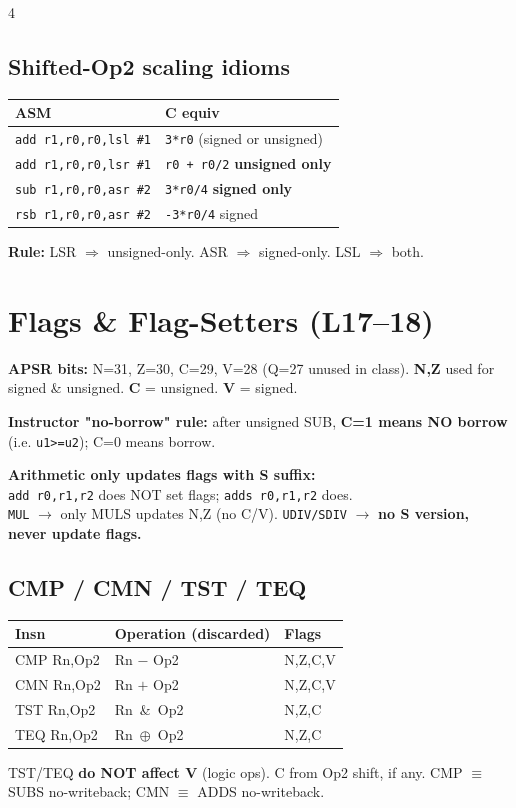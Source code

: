 \documentclass[8pt,landscape]{extarticle}
\newcommand{\asm}[1]{\texttt{\scriptsize #1}}
\newcommand{\cee}[1]{\texttt{\scriptsize #1}}
\begin{document}
\begin{multicols*}{4}
\subsection{Shifted-Op2 scaling idioms}
\begin{tabular}{@{}ll@{}}
\toprule
ASM & C equiv \\
\midrule
\asm{add r1,r0,r0,lsl \#1} & \cee{3*r0} (signed or unsigned) \\
\asm{add r1,r0,r0,lsr \#1} & \cee{r0 + r0/2} \textbf{unsigned only} \\
\asm{sub r1,r0,r0,asr \#2} & \cee{3*r0/4} \textbf{signed only} \\
\asm{rsb r1,r0,r0,asr \#2} & \cee{-3*r0/4} signed \\
\bottomrule
\end{tabular}

\textbf{Rule:} LSR $\Rightarrow$ unsigned-only. ASR $\Rightarrow$ signed-only. LSL $\Rightarrow$ both.

\section{Flags \& Flag-Setters (L17--18)}

\textbf{APSR bits:} N=31, Z=30, C=29, V=28 (Q=27 unused in class).
\textbf{N,Z} used for signed \& unsigned. \textbf{C} = unsigned. \textbf{V} = signed.

\textbf{Instructor "no-borrow" rule:} after unsigned SUB, \textbf{C=1 means NO borrow} (i.e. \cee{u1>=u2}); C=0 means borrow.

\textbf{Arithmetic only updates flags with S suffix:}\\
\asm{add r0,r1,r2} does NOT set flags; \asm{adds r0,r1,r2} does.\\
\texttt{MUL} $\to$ only MULS updates N,Z (no C/V). \texttt{UDIV/SDIV} $\to$ \textbf{no S version, never update flags.}

\subsection{CMP / CMN / TST / TEQ}
\begin{tabular}{@{}lll@{}}
\toprule
Insn & Operation (discarded) & Flags \\
\midrule
CMP Rn,Op2 & Rn $-$ Op2 & N,Z,C,V \\
CMN Rn,Op2 & Rn $+$ Op2 & N,Z,C,V \\
TST Rn,Op2 & Rn \,\&\, Op2 & N,Z,C \\
TEQ Rn,Op2 & Rn \,$\oplus$\, Op2 & N,Z,C \\
\bottomrule
\end{tabular}
TST/TEQ \textbf{do NOT affect V} (logic ops). C from Op2 shift, if any. CMP $\equiv$ SUBS no-writeback; CMN $\equiv$ ADDS no-writeback.


\end{multicols*}
\end{document}
